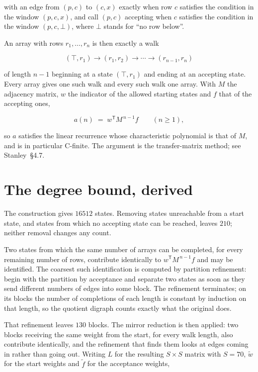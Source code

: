 \documentclass[11pt]{article}
\theoremstyle{definition}
\begin{document}
with an edge from $(p,c)$ to $(c,x)$ exactly when row $c$ satisfies the condition in the window $(p,c,x)$, and call $(p,c)$ accepting when $c$ satisfies the condition in the window $(p,c,\bot)$, where $\bot$ stands for ``no row below''.

An array with rows $r_1,\dots,r_n$ is then exactly a walk

\[(\top,r_1) \to (r_1,r_2) \to \cdots \to (r_{n-1},r_n)\]

of length $n-1$ beginning at a state $(\top,r_1)$ and ending at an accepting state. Every array gives one such walk and every such walk one array. With $M$ the adjacency matrix, $w$ the indicator of the allowed starting states and $f$ that of the accepting ones,

\[a(n) \;=\; w^{\mathsf T} M^{\,n-1} f \qquad (n \ge 1),\]

so $a$ satisfies the linear recurrence whose characteristic polynomial is that of $M$, and is in particular C-finite. The argument is the transfer-matrix method; see Stanley~\S4.7.

\section{The degree bound, derived}

The construction gives $16512$ states. Removing states unreachable from a start state, and states from which no accepting state can be reached, leaves $210$; neither removal changes any count.

Two states from which the same number of arrays can be completed, for every remaining number of rows, contribute identically to $w^{\mathsf T}M^{\,n-1}f$ and may be identified. The coarsest such identification is computed by partition refinement: begin with the partition by acceptance and separate two states as soon as they send different numbers of edges into some block. The refinement terminates; on its blocks the number of completions of each length is constant by induction on that length, so the quotient digraph counts exactly what the original does.

That refinement leaves $130$ blocks. The mirror reduction is then applied: two blocks receiving the same weight from the start, for every walk length, also contribute identically, and the refinement that finds them looks at edges coming in rather than going out. Writing $L$ for the resulting $S \times S$ matrix with $S = 70$, $\tilde w$ for the start weights and $\tilde f$ for the acceptance weights,
\end{document}
